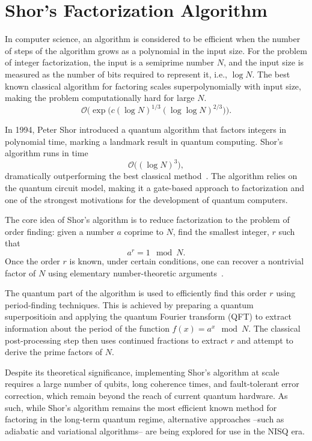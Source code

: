 \section{Shor's Factorization Algorithm}

In computer science, an algorithm is considered to be efficient when the number of steps
of the algorithm grows as a polynomial in the input size. For the problem of integer factorization,
the input is a semiprime number $N$, and the input size is measured as the number of bits
required to represent it, i.e., $\log N$. The best known classical algorithm for factoring
scales superpolynomially with input size, making the problem computationally hard for large $N$.
\begin{equation}
    \mathcal{O} \bigg( \exp \big( c(\log N)^{1/3} (\log \log N)^{2/3} \big) \bigg).
    \label{eq:field_sieve_scaling}
\end{equation}

In 1994, Peter Shor introduced a quantum algorithm that factors integers in polynomial time,
marking a landmark result in quantum computing. Shor's algorithm runs in time
\begin{equation}
    \mathcal{O} \big( (\log N)^3 \big),
    \label{eq:shor_scaling}
\end{equation}
dramatically outperforming the best classical method~\cite{nielsen00}. The algorithm relies on the quantum
circuit model, making it a gate-based approach to factorization and one of the strongest motivations
for the development of quantum computers.

The core idea of Shor's algorithm is to reduce factorization to the problem of order finding:
given a number $a$ coprime to $N$, find the smallest integer, $r$ such that
\begin{equation}
    a^r = 1 \mod N.
    \label{eq:order_finding}
\end{equation}
Once the order $r$ is known, under certain conditions, one can recover a nontrivial factor of
$N$ using elementary number-theoretic arguments~\cite{nielsen00}.

The quantum part of the algorithm is used to efficiently find this order $r$ using
period-finding techniques. This is achieved by preparing a quantum superpositioin and applying the
quantum Fourier transform (QFT) to extract information about the period of the function
$f(x) = a^x \mod N$. The classical post-processing step then uses continued fractions to extract $r$
and attempt to derive the prime factors of $N$.

Despite its theoretical significance, implementing Shor's algorithm at scale requires a
large number of qubits, long coherence times, and fault-tolerant error correction,
which remain beyond the reach of current quantum hardware. As such, while Shor's algorithm remains
the most efficient known method for factoring in the long-term quantum regime, alternative approaches
--such as adiabatic and variational algorithms-- are being explored for use in the NISQ era.